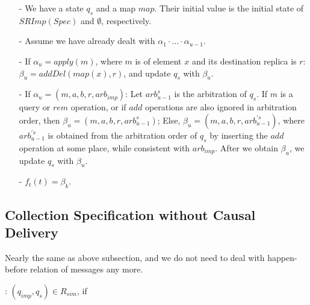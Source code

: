 \begin{itemize}
\setlength{\itemsep}{0.5pt}
\item[-] We have a state $q_s$ and a map $\mathit{map}$. Their initial value is the initial state of $SRImp(Spec)$ and $\emptyset$, respectively.  

\item[-] Assume we have already dealt with $\alpha_1 \cdot \ldots \cdot \alpha_{u-1}$. 

\item[-] If $\alpha_u = apply(m)$, where $m$ is of element $x$ and its destination replica is $r$: $\beta_u = addDel(map(x),r)$, and update $q_s$ with $\beta_u$. 

\item[-] If $\alpha_u = (m,a,b,r,\mathit{arb}_{\mathit{imp}})$: Let $\mathit{arb}_{u-1}^s$ is the arbitration of $q_s$. If $m$ is a query or $\mathit{rem}$ operation, or if $add$ operations are also ignored in arbitration order, then $\beta_u = (m,a,b,r,\mathit{arb}_{u-1}^s)$; Else, $\beta_u = (m,a,b,r,\mathit{arb}_{u-1}^{'s})$, where $\mathit{arb}_{u-1}^{'s}$ is obtained from the arbitration order of $q_s$ by inserting the $add$ operation at some place, while consistent with $\mathit{arb}_{\mathit{imp}}$. After we obtain $\beta_u$, we update $q_s$ with $\beta_u$. 

\item[-] $f_t(t) = \beta_k$. 
\end{itemize}




\subsection{Collection Specification without Causal Delivery}
\label{subsec:collection specification without calusal delivery}

Nearly the same as above subsection, and we do not need to deal with happen-before relation of messages any more. 

:  $(q_{\mathit{imp}},q_s) \in R_{\mathit{sim}}$, if 


